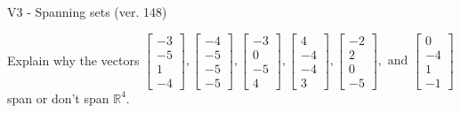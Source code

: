 \begin{exercise}
  \begin{exerciseTitle}V3 - Spanning sets (ver. 148)\end{exerciseTitle}
  \begin{exerciseStatement}
    Explain why the vectors \(\left[\begin{array}{r}
-3 \\
-5 \\
1 \\
-4
\end{array}\right] , \left[\begin{array}{r}
-4 \\
-5 \\
-5 \\
-5
\end{array}\right] , \left[\begin{array}{r}
-3 \\
0 \\
-5 \\
4
\end{array}\right] , \left[\begin{array}{r}
4 \\
-4 \\
-4 \\
3
\end{array}\right] , \left[\begin{array}{r}
-2 \\
2 \\
0 \\
-5
\end{array}\right] , \text{ and } \left[\begin{array}{r}
0 \\
-4 \\
1 \\
-1
\end{array}\right]\) span or don't span \(\mathbb{R}^4\). 
	



\end{exerciseStatement}
\end{exercise}
